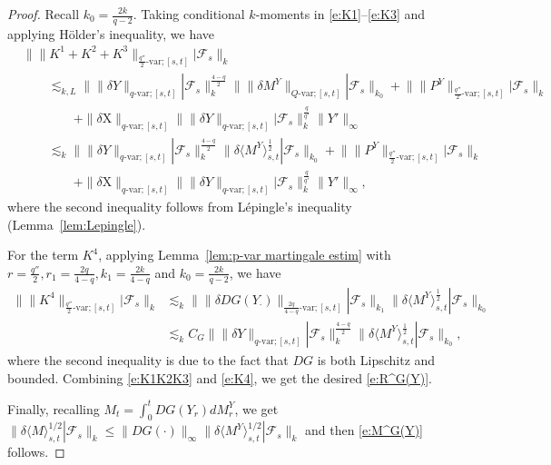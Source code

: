 \documentclass[11pt,reqno]{amsart}
\numberwithin{equation}{section}
\begin{document}
\begin{proof}
Recall $k_0 = \frac{2k}{q-2}$. Taking conditional $k$-moments in \eqref{e:K1}--\eqref{e:K3} 
and applying H\"older's inequality, we have 
\begin{equation}\label{e:K1K2K3}
\begin{aligned}
&\big\| \|K^{1} + K^2 + K^3\|_{\frac{q''}{2}\text{-var};[s,t]} | \mathcal F_{s} \big\|_{k}\\
&\qquad \lesssim_{k,L} \big\|\|\delta Y\|_{q\text{-var};[s,t]} | \mathcal F_{s} \big\|^{\frac{4-q}{2}}_{k}\big\| 
\|\delta M^{Y}\|_{Q\text{-var};[s,t]} | \mathcal F_{s} \big\|_{k_0} + \big\| \|P^Y\|_{\frac{q''}{2}\text{-var};[s,t]} \big| \mathcal F_{s} \big\|_{k}\\
&\qquad\qquad + \|\delta \mathrm X\|_{q\text{-var};[s,t]}\big\| \|\delta Y\|_{q\text{-var};[s,t]} | \mathcal F_{s} \big\|^{\frac{q}{q'}}_{k} \|Y'\|_{\infty}\\
&\qquad \lesssim_{k} \big\| \|\delta Y\|_{q\text{-var};[s,t]} | \mathcal F_{s} \big\|^{\frac{4-q}{2}}_{k} \big\| \delta \langle M^{Y}\rangle^{\frac{1}{2}}_{s,t} | \mathcal F_{s} \big\|_{k_0}
 + \big\| \|P^Y\|_{\frac{q''}{2}\text{-var};[s,t]} | \mathcal F_{s} \big\|_{k}\\
&\qquad\qquad + \|\delta \mathrm X\|_{q\text{-var};[s,t]} \big\| \|\delta Y\|_{q\text{-var};[s,t]} | \mathcal F_{s} \big\|^{\frac{q}{q'}}_{k} \|Y'\|_{\infty},
\end{aligned}
\end{equation}
where the second inequality follows from L\'epingle's inequality (Lemma~\ref{lem:Lepingle}).

For the term $K^{4}$, applying Lemma~\ref{lem:p-var martingale estim} with $r = \frac{q''}{2}, r_{1} = \frac{2q}{4-q}, k_{1} = \frac{2k}{4-q}$ and $k_{0} = \frac{2k}{q-2}$, we have
\begin{equation}\label{e:K4}
\begin{aligned}
\big\| \|K^{4}\|_{\frac{q''}{2}\text{-var};[s,t]} | \mathcal F_{s} \big\|_{k} &\lesssim_{k} \big\| \|\delta D G(Y_{\bm\cdot})\|_{\frac{2q}{4-q}\text{-var};[s,t]} | \mathcal F_{s} \big\|_{k_1} \big\| \delta \langle M^{Y}\rangle^{\frac{1}{2}}_{s,t} | \mathcal F_{s} \big\|_{k_0}\\
&\lesssim_{k} C_G \big\| \|\delta Y\|_{q\text{-var};[s,t]} | \mathcal F_{s} \big\|^{\frac{4-q}{2}}_{k} \big\| \delta \langle M^{Y} \rangle^{\frac{1}{2}}_{s,t} | \mathcal F_{s} \big\|_{k_0},
\end{aligned}
\end{equation}
where the second inequality is due to the fact that $DG$ is both Lipschitz and bounded. Combining \eqref{e:K1K2K3} and \eqref{e:K4}, we get the desired \eqref{e:R^G(Y)}.

Finally, recalling $M_t = \int_{0}^{t} D G(Y_{r}) d M^{Y}_{r}$, we get $\big\|\delta \langle M\rangle^{1/2}_{s,t}| \mathcal F_{s} \big\|_{k} \le \|DG(\bm\cdot)\|_{\infty} \big\| \delta \langle M^{Y}\rangle^{1/2}_{s,t} | \mathcal F_{s}\big\|_{k}$
and then \eqref{e:M^G(Y)} follows.
\end{proof}
\end{document}
